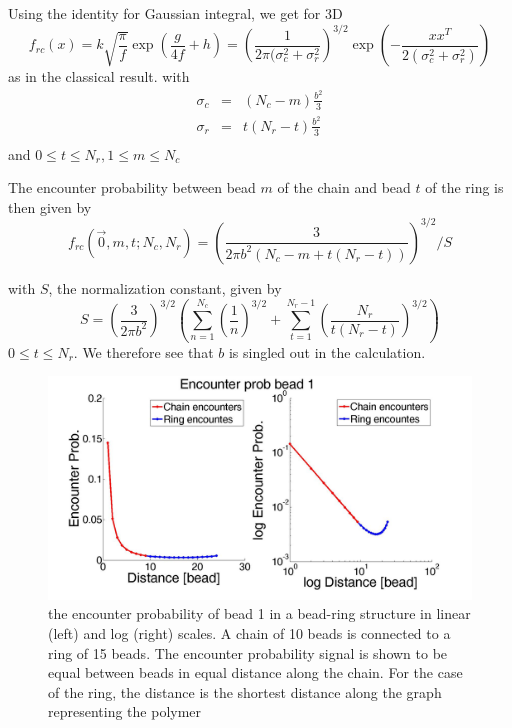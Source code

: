 \documentclass{report}
\begin{document}
Using the identity for Gaussian integral, we get for 3D
\begin{equation*}
f_{rc}(x) = k\sqrt{\frac{\pi}{f}}\exp(\frac{g}{4f}+h)=\left(\frac{1}{2\pi(\sigma_c^2 +\sigma_r^2}\right)^{3/2}\exp\left(-\frac{xx^T}{2(\sigma_c^2+\sigma_r^2)}\right)
\end{equation*}
as in the classical result. with 
\begin{eqnarray*}
\sigma_c &=& (N_c-m)\frac{b^2}{3}\\
\sigma_r &=& t(N_r-t)\frac{b^2}{3}\\
\end{eqnarray*}
and $0 \leq t\leq N_r, 1\leq m\leq N_c$

The encounter probability between bead $m$ of the chain and bead $t$ of the ring is then given by 
\begin{equation*}
f_{rc}(\vec{0},m,t;N_c,N_r)=\left(\frac{3}{2\pi b^2(N_c-m+t(N_r-t))}\right)^{3/2}/S
\end{equation*}

with $S$, the normalization constant, given by 
\begin{equation*}
S= \left(\frac{3}{2\pi b^2}\right)^{3/2}\left(\sum_{n=1}^{N_c} \left(\frac{1}{n}\right)^{3/2}+\sum_{t=1}^{N_r-1} \left(\frac{N_r}{ t(N_r-t)}\right)^{3/2}\right)
\end{equation*}
$0\leq t\leq N_r$. 
We therefore see that $b$ is singled out in the calculation. 
\begin{figure}[h!]
\includegraphics[scale=0.2]{encounterProbChainRingBead1}
\caption{the encounter probability of bead 1 in a bead-ring structure in linear (left) and log (right) scales. A chain of 10 beads is connected to a ring of 15 beads. The encounter probability signal is shown to be equal between beads in equal distance along the chain. For the case of the ring, the distance is the shortest distance along the graph representing the polymer} \label{figure_encounterProbChainRingBead1}
\end{figure}
\end{document}
